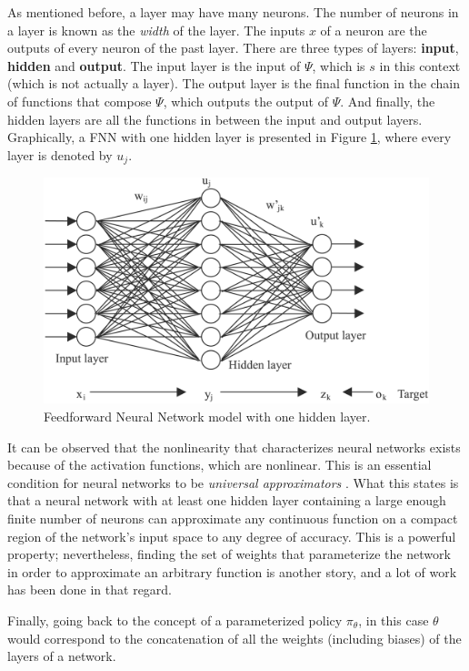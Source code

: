 As mentioned before, a layer may have many neurons. The number of neurons in a layer is known as the \emph{width} of the layer. The inputs $x$ of a neuron are the outputs of every neuron of the past layer.  There are three types of layers: \textbf{input}, \textbf{hidden} and \textbf{output}. The input layer is the input of $\Psi$, which is $s$ in this context (which is not actually a layer). The output layer is the final function in the chain of functions that compose $\Psi$, which outputs the output of $\Psi$. And finally, the hidden layers are all the functions in between the input and output layers. Graphically, a FNN with one hidden layer is presented in Figure \ref{fig:FNN}, where every layer is denoted by $u_{j}$.

\begin{figure}[H]
    \centering
    \includegraphics[width=0.6\linewidth]{imagenes/cap1/NeuralNetwork.png}
    \caption{Feedforward Neural Network model with one hidden layer.\protect\footnotemark}
    \label{fig:FNN}
\end{figure}

It can be observed that the nonlinearity that characterizes neural networks exists because of the activation functions, which are nonlinear. This is an essential condition for neural networks to be \emph{universal approximators} \cite{cybenko1989approximation, hornik1991approximation}. What this states is that a neural network with at least one hidden layer containing a large enough finite number of neurons can approximate any continuous function on a compact region of the network's input space to any degree of accuracy. This is a powerful property; nevertheless, finding the set of weights that parameterize the network in order to approximate an arbitrary function is another story, and a lot of work has been done in that regard. 

Finally, going back to the concept of a parameterized policy $\pi_{\theta}$, in this case $\theta$ would correspond to the concatenation of all the weights (including biases) of the layers of a network. \newline

